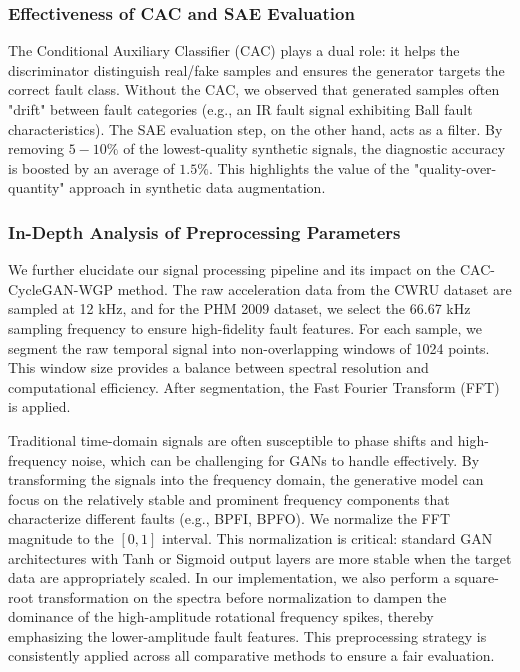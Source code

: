 \subsubsection{Effectiveness of CAC and SAE Evaluation}
The Conditional Auxiliary Classifier (CAC) plays a dual role: it helps the discriminator distinguish real/fake samples and ensures the generator targets the correct fault class. Without the CAC, we observed that generated samples often "drift" between fault categories (e.g., an IR fault signal exhibiting Ball fault characteristics). The SAE evaluation step, on the other hand, acts as a filter. By removing $5-10\%$ of the lowest-quality synthetic signals, the diagnostic accuracy is boosted by an average of $1.5\%$. This highlights the value of the "quality-over-quantity" approach in synthetic data augmentation.

\subsubsection{In-Depth Analysis of Preprocessing Parameters}
We further elucidate our signal processing pipeline and its impact on the CAC-CycleGAN-WGP method. The raw acceleration data from the CWRU dataset are sampled at 12 kHz, and for the PHM 2009 dataset, we select the 66.67 kHz sampling frequency to ensure high-fidelity fault features. For each sample, we segment the raw temporal signal into non-overlapping windows of 1024 points. This window size provides a balance between spectral resolution and computational efficiency. After segmentation, the Fast Fourier Transform (FFT) is applied. 

Traditional time-domain signals are often susceptible to phase shifts and high-frequency noise, which can be challenging for GANs to handle effectively. By transforming the signals into the frequency domain, the generative model can focus on the relatively stable and prominent frequency components that characterize different faults (e.g., BPFI, BPFO). We normalize the FFT magnitude to the $[0, 1]$ interval. This normalization is critical: standard GAN architectures with Tanh or Sigmoid output layers are more stable when the target data are appropriately scaled. In our implementation, we also perform a square-root transformation on the spectra before normalization to dampen the dominance of the high-amplitude rotational frequency spikes, thereby emphasizing the lower-amplitude fault features. This preprocessing strategy is consistently applied across all comparative methods to ensure a fair evaluation.

